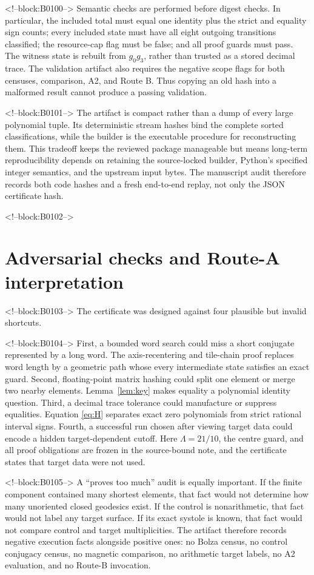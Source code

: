\documentclass[11pt,a4paper]{article}
\theoremstyle{definition}
\begin{document}
<!--block:B0100-->
Semantic checks are performed before digest checks.  In particular, the
included total must equal one identity plus the strict and equality sign
counts; every included state must have all eight outgoing transitions
classified; the resource-cap flag must be false; and all proof guards must
pass.  The witness state is rebuilt from \(g_0g_3\), rather than trusted as a
stored decimal trace.  The validation artifact also requires the negative
scope flags for both censuses, comparison, A2, and Route B.  Thus copying an
old hash into a malformed result cannot produce a passing validation.

<!--block:B0101-->
The artifact is compact rather than a dump of every large polynomial tuple.
Its deterministic stream hashes bind the complete sorted classifications,
while the builder is the executable procedure for reconstructing them.  This
tradeoff keeps the reviewed package manageable but means long-term
reproducibility depends on retaining the source-locked builder, Python's
specified integer semantics, and the upstream input bytes.  The manuscript
audit therefore records both code hashes and a fresh end-to-end replay, not
only the JSON certificate hash.

<!--block:B0102-->
\section{Adversarial checks and Route-A interpretation}

<!--block:B0103-->
The certificate was designed against four plausible but invalid shortcuts.

<!--block:B0104-->
First, a bounded word search could miss a short conjugate represented by a
long word.  The axis-recentering and tile-chain proof replaces word length by
a geometric path whose every intermediate state satisfies an exact guard.
Second, floating-point matrix hashing could split one element or merge two
nearby elements.  Lemma~\ref{lem:key} makes equality a polynomial identity
question.  Third, a decimal trace tolerance could manufacture or suppress
equalities.  Equation \eqref{eq:H} separates exact zero polynomials from
strict rational interval signs.  Fourth, a successful run chosen after
viewing target data could encode a hidden target-dependent cutoff.  Here
\(\Lambda=21/10\), the centre guard, and all proof obligations are frozen in
the source-bound note, and the certificate states that target data were not
used.

<!--block:B0105-->
A ``proves too much'' audit is equally important.  If the finite component
contained many shortest elements, that fact would not determine how many
unoriented closed geodesics exist.  If the control is nonarithmetic, that fact
would not label any target surface.  If its exact systole is known, that fact
would not compare control and target multiplicities.  The artifact therefore
records negative execution facts alongside positive ones: no Bolza census,
no control conjugacy census, no magnetic comparison, no arithmetic target
labels, no A2 evaluation, and no Route-B invocation.
\end{document}
